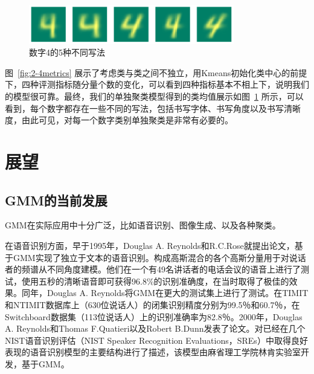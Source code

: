 \documentclass[UTF8]{ctexart}
\begin{document}
\begin{figure}[!h]
  \centering
  \includegraphics[width=0.8\textwidth]{./figures/diff4.pdf}
  \vspace{-.3cm}\caption{数字4的5种不同写法}\label{fig:diff4}
\end{figure}

图~\ref{fig:2-4metrics} 展示了考虑类与类之间不独立，用Kmeans初始化类中心的前提下，四种评测指标随分量个数的变化，可以看到四种指标基本不相上下，说明我们的模型很可靠。最终，我们的单独聚类模型得到的类均值展示如图~\ref{fig:diff4} 所示，可以看到，每个数字都存在一些不同的写法，包括书写字体、书写角度以及书写清晰度，由此可见，对每一个数字类别单独聚类是非常有必要的。


\section{展望}

\subsection{GMM的当前发展}

GMM在实际应用中十分广泛，比如语音识别、图像生成、以及各种聚类。

在语音识别方面，早于1995年，Douglas A. Reynolds和R.C.Rose就提出论文，基于GMM实现了独立于文本的语音识别。构成高斯混合的各个高斯分量用于对说话者的频谱从不同角度建模。他们在一个有49名讲话者的电话会议的语音上进行了测试，使用五秒的清晰语音即可获得96.8\%的识别准确度，在当时取得了极佳的效果。同年，Douglas A. Reynolds将GMM在更大的测试集上进行了测试。在TIMIT和NTIMIT数据库上（630位说话人）的闭集识别精度分别为99.5％和60.7％，在Switchboard数据集（113位说话人）上的识别准确率为82.8％。2000年，Douglas A. Reynolds和Thomas F.Quatieri以及Robert B.Dunn发表了论文。对已经在几个NIST语音识别评估（NIST Speaker Recognition Evaluations，SREs）中取得良好表现的语音识别模型的主要结构进行了描述，该模型由麻省理工学院林肯实验室开发，基于GMM。
\end{document}
